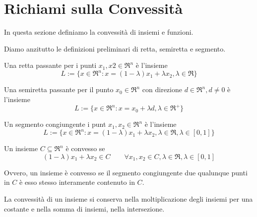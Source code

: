 \chapter{Richiami sulla Convessità}
\label{sec:foundations-convexity}

In questa sezione definiamo la convessità di insiemi e funzioni.

Diamo anzitutto le definizioni preliminari di retta, semiretta e segmento.

\begin{definition}[Retta]
	\label{dfn:line}
	Una retta passante per i punti $x_{1},x{2}\in\Re^{n}$ è l'insieme
	\begin{equation}
		\label{eqn:line}
		L:=\{x\in\Re^{n}:x=(1-\lambda)x_{1}+\lambda x_{2},\lambda\in\Re\}
	\end{equation}
\end{definition}

\begin{definition}[Semiretta]
	\label{dfn:semiline}
	Una semiretta passante per il punto $x_{0}\in\Re^{n}$ con direzione $d\in\Re^{n},d\neq0$ è l'insieme
	\begin{equation}
		\label{eqn:semiline}
		L:=\{x\in\Re^{n}:x=x_{0}+\lambda d,\lambda\in\Re^{+}\}
	\end{equation}
\end{definition}

\begin{definition}[Segmento]
	\label{dfn:segment}
	Un segmento congiungente i punt $x_{1},x_{2}\in\Re^{n}$ è l'insieme
	\begin{equation}
		\label{eqn:segment}
		L:=\{x\in\Re^{n}:x=(1-\lambda)x_{1}+\lambda x_{2},\lambda\in\Re,\lambda\in [0,1] \}
	\end{equation}
\end{definition}

\begin{definition}
	\label{dfn:convex-set}
	Un insieme $C\subseteq\Re^{n}$ è convesso se
	\begin{equation}
		\label{eqn:convex-set}
		(1-\lambda)x_{1}+\lambda x_{2} \in C \qquad \forall x_{1},x_{2}\in C,\lambda\in\Re,\lambda\in [0,1]
	\end{equation}
\end{definition}

Ovvero, un insieme è convesso se il segmento congiungente due qualunque punti in $C$ è esso stesso interamente contenuto in $C$.

La convessità di un insieme si conserva nella moltiplicazione degli insiemi per una costante e nella somma di insiemi, nella intersezione.

